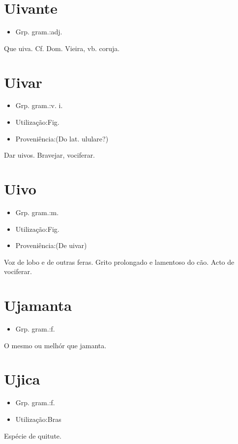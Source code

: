 \documentclass{article}
\begin{document}
\section{Uivante}
\begin{itemize}
\item {Grp. gram.:adj.}
\end{itemize}
Que uiva. Cf. Dom. Vieira, vb. \textunderscore coruja\textunderscore .
\section{Uivar}
\begin{itemize}
\item {Grp. gram.:v. i.}
\end{itemize}
\begin{itemize}
\item {Utilização:Fig.}
\end{itemize}
\begin{itemize}
\item {Proveniência:(Do lat. \textunderscore ululare\textunderscore ?)}
\end{itemize}
Dar uivos.
Bravejar, vociferar.
\section{Uivo}
\begin{itemize}
\item {Grp. gram.:m.}
\end{itemize}
\begin{itemize}
\item {Utilização:Fig.}
\end{itemize}
\begin{itemize}
\item {Proveniência:(De \textunderscore uivar\textunderscore )}
\end{itemize}
Voz de lobo e de outras feras.
Grito prolongado e lamentoso do cão.
Acto de vociferar.
\section{Ujamanta}
\begin{itemize}
\item {Grp. gram.:f.}
\end{itemize}
O mesmo ou melhór que \textunderscore jamanta\textunderscore .
\section{Ujica}
\begin{itemize}
\item {Grp. gram.:f.}
\end{itemize}
\begin{itemize}
\item {Utilização:Bras}
\end{itemize}
Espécie de quitute.
\end{document}
